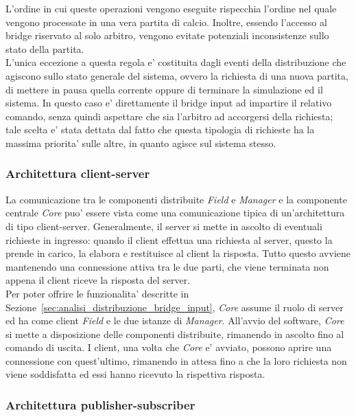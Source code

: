 L'ordine in cui queste operazioni vengono eseguite rispecchia l'ordine nel quale vengono processate in una vera partita di calcio. Inoltre, essendo l'accesso al bridge riservato al solo arbitro, vengono evitate potenziali inconsistenze sullo stato della partita.\\

L'unica eccezione a questa regola e' costituita dagli eventi della distribuzione che agiscono sullo stato generale del sistema, ovvero la richiesta di una nuova partita, di mettere in pausa quella corrente oppure di terminare la simulazione ed il sistema. In questo caso e' direttamente il bridge input ad impartire il relativo comando, senza quindi aspettare che sia l'arbitro ad accorgersi della richiesta; tale scelta e' stata dettata dal fatto che questa tipologia di richieste ha la massima priorita' sulle altre, in quanto agisce sul sistema stesso.

\subsubsection{Architettura client-server}
\label{sec:analisi_client_server}

La comunicazione tra le componenti distribuite \textit{Field} e \textit{Manager} e la componente centrale \textit{Core} puo' essere vista come una comunicazione tipica di un'architettura di tipo client-server. Generalmente, il server si mette in ascolto di eventuali richieste in ingresso: quando il client effettua una richiesta al server, questo la prende in carico, la elabora e restituisce al client la risposta. Tutto questo avviene mantenendo una connessione attiva tra le due parti, che viene terminata non appena il client riceve la risposta del server.\\

Per poter offrire le funzionalita' descritte in Sezione~\ref{sec:analisi_distribuzione_bridge_input}, \textit{Core} assume il ruolo di server ed ha come client \textit{Field} e le due istanze di \textit{Manager}. All'avvio del software, \textit{Core} si mette a disposizione delle componenti distribuite, rimanendo in ascolto fino al comando di uscita. I client, una volta che \textit{Core} e' avviato, possono aprire una connessione con quest'ultimo, rimanendo in attesa fino a che la loro richiesta non viene soddisfatta ed essi hanno ricevuto la rispettiva risposta.

\subsubsection{Architettura publisher-subscriber}
\label{sec:analisi_client_pusblisher_subscriber}

